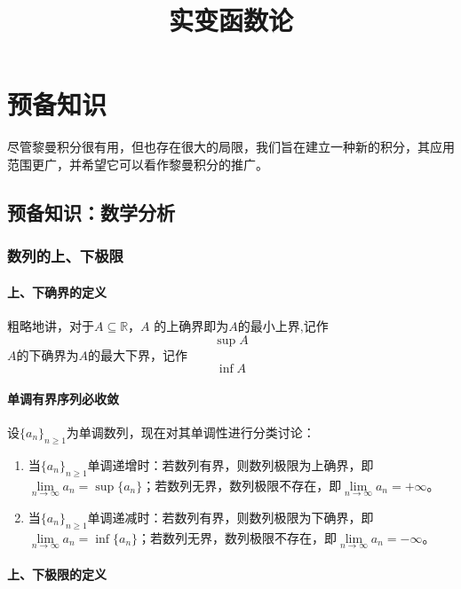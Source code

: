 \documentclass{ctexbook}
\title{实变函数论}
\newcommand{\R}{\mathbb{R}}
\newcommand{\ITEMS}{\begin{enumerate}[leftmargin=4em]}
\newcommand{\ITEME}{\end{enumerate}}
\begin{document}
\maketitle

\tableofcontents

\chapter{预备知识}

尽管黎曼积分很有用，但也存在很大的局限，我们旨在建立一种新的积分，其应用范围更广，并希望它可以看作黎曼积分的推广。


\section{预备知识：数学分析}

\subsection{数列的上、下极限}

\subsubsection{上、下确界的定义}

粗略地讲，对于$A \subseteq \R$，$A$ 的上确界即为$A$的最小上界,记作
\[
\sup A
\]
$A$的下确界为$A$的最大下界，记作
\[
\inf A
\]
\smallskip

\subsubsection{单调有界序列必收敛}
设$\{a_n \}_{n\ge 1}$为单调数列，现在对其单调性进行分类讨论：
\ITEMS
	\item 当$\{a_n \}_{n\ge 1}$单调递增时：若数列有界，则数列极限为上确界，即$\lim\limits_{n\to\infty} a_n = \sup\{a_n\}$；若数列无界，数列极限不存在，即$\lim\limits_{n\to\infty} a_n = +\infty$。
	\item 当$\{a_n \}_{n\ge 1}$单调递减时：若数列有界，则数列极限为下确界，即$\lim\limits_{n\to\infty} a_n = \inf\{a_n\}$；若数列无界，数列极限不存在，即$\lim\limits_{n\to\infty} a_n = -\infty$。
\ITEME

\smallskip

\subsubsection{上、下极限的定义}
\end{document}
